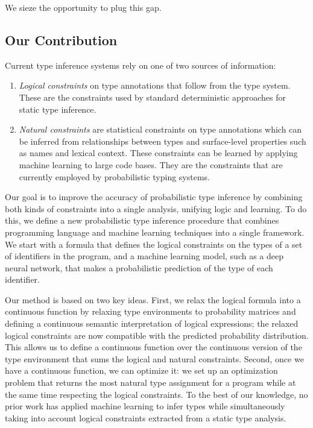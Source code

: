 \documentclass[sigplan,10pt,review,anonymous]{acmart} %
\theoremstyle{plain}
\theoremstyle{remark}
\theoremstyle{definition}
\begin{document}
We sieze the opportunity to plug this gap.

\subsection{Our Contribution}
Current type inference systems rely
on one of two sources of information:
\begin{enumerate}[label=(\Roman*)]
  \item \emph{Logical constraints} on type annotations that follow from the type system.
        These are the  constraints used by standard deterministic approaches for static type inference.
  \item \emph{Natural constraints} are statistical constraints on type annotations
        which can be inferred from relationships between types and surface-level properties such as names and lexical context.
        These constraints can be learned by applying machine learning to large code bases.
        They are the constraints that are currently employed by probabilistic typing systems.
\end{enumerate}
Our goal is to improve the accuracy of probabilistic type
inference by combining both kinds of constraints into a single analysis, unifying logic and learning.
To do this, we define a new probabilistic type inference procedure that combines
programming language and machine learning techniques into a single framework.
We start with a formula that defines the logical constraints on the types of a set of identifiers in the program,
and a machine learning model, such as a deep neural network, that makes a probabilistic prediction
of the type of each identifier.

Our method is based on two key ideas.
First, we relax the logical formula into a continuous function by relaxing type environments
to probability matrices and defining
a continuous semantic interpretation of logical expressions; the relaxed logical constraints
are now compatible with the predicted probability distribution.
This allows us to define a continuous function over the continuous version of the type environment
that sums the logical and natural constraints.
Second, once we have a continuous function, we can optimize it:
we set up an optimization problem that returns the most natural type assignment for a
program while at the same time respecting the logical constraints.
To the best of our knowledge, no prior work has applied machine learning to infer types
while simultaneously taking into account logical constraints extracted from a static type analysis.
\end{document}
